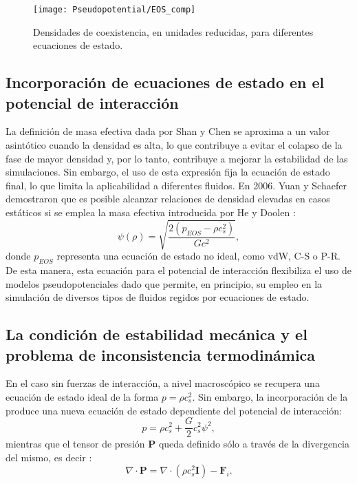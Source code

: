 \begin{figure}[ht]
	\centering
	\texttt{[image: Pseudopotential/EOS\_comp]}
	\caption{Densidades de coexistencia, en unidades reducidas, para diferentes ecuaciones de estado.}
	\label{fig:EOS}
\end{figure}




\subsection{Incorporaci\'on de ecuaciones de estado en el potencial de interacci\'on}

La definici\'on de masa efectiva dada por Shan y Chen se aproxima a un valor asint\'otico cuando la densidad es alta, lo que contribuye a evitar el colapso de la fase de mayor densidad y, por lo tanto, contribuye a mejorar la estabilidad de las simulaciones. Sin embargo, el uso de esta expresi\'on fija la ecuaci\'on de estado final, lo que limita la aplicabilidad a diferentes fluidos. En 2006. Yuan y Schaefer \cite{yuan_equations_2006} demostraron que es posible alcanzar relaciones de densidad elevadas en casos est\'aticos si se emplea la masa efectiva introducida por He y Doolen \cite{he_thermodynamic_2002}:
\begin{equation}
	\psi(\rho) = \sqrt{\dfrac{2(p_{EOS} - \rho c_s^2)}{Gc^2}},
	\label{eq:potencial}
\end{equation}
donde $p_{EOS}$ representa una ecuaci\'on de estado no ideal, como vdW, C-S o P-R. De esta manera, esta ecuaci\'on para el potencial de interacci\'on flexibiliza el uso de modelos pseudopotenciales dado que permite, en principio, su empleo en la simulaci\'on de diversos tipos de fluidos regidos por ecuaciones de estado.




\subsection{La condici\'on de estabilidad mec\'anica y el problema de inconsistencia termodin\'amica}

En el caso sin fuerzas de interacci\'on, a nivel macrosc\'opico se recupera una ecuaci\'on de estado ideal de la forma $p=\rho c_s^2$. Sin embargo, la incorporaci\'on de la  produce una nueva ecuaci\'on de estado dependiente del potencial de interacci\'on:
\begin{equation}
	p = \rho c_s^2 + \dfrac{G}{2} c_s^2 \psi ^2,
\end{equation}
mientras que el tensor de presi\'on $\bm{P}$ queda definido s\'olo a trav\'es de la divergencia del mismo, es decir \cite{he_thermodynamic_2002}:
\begin{equation}
	\nabla \cdot \bm{P} = \nabla \cdot (\rho c_s^2 \bm{I}) - \bm{F}_i.
	\label{eq:ptens}
\end{equation}

